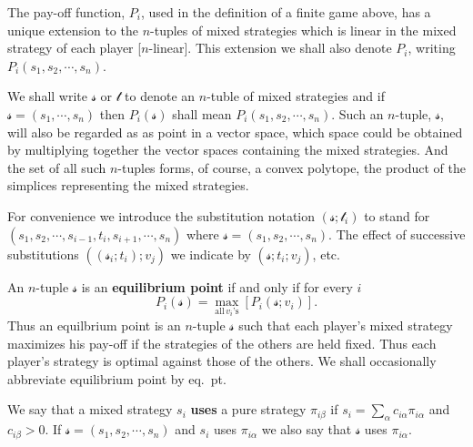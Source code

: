    \begin{definition}
       The pay-off function, $P_i $, used in the definition of a finite game above, has a unique extension to the $n$-tuples of mixed strategies which is linear in the mixed strategy of each player [$n$-linear]. This extension we shall also denote $P_i $, writing $P_i (s_1,s_2,\cdots ,s_n )$.
   \end{definition}
   We shall write $\mathcal{s} $ or $\mathcal{t} $ to denote an $n$-tuble of mixed strategies and if $\mathcal{s} =(s_1,\cdots ,s_n )$ then $P_i (\mathcal{s} )$ shall mean $P_i (s_1,s_2,\cdots ,s_n )$. Such an $n$-tuple, $\mathcal{s} $, will also be regarded as as point in a vector space, which space could be obtained by multiplying together the vector spaces containing the mixed strategies. And the set of all such $n$-tuples forms, of course, a convex polytope, the product of the simplices representing the mixed strategies.

   For convenience we introduce the substitution notation $(\mathcal{s} ;\mathcal{t} _i )$ to stand for $(s_1,s_2,\cdots ,s_{i-1}, t_i ,s_{i+1},\cdots ,s_n )$ where $\mathcal{s} =(s_1,s_2,\cdots ,s_n )$. The effect of successive substitutions $((\mathcal{s} _i ;t_i );v_j )$ we indicate by $(\mathcal{s} ;t_i ;v_j )$, etc.
   \begin{definition}
      An $n$-tuple $\mathcal{s} $ is an \textbf{equilibrium point} if and only if for every $i$ 
      \begin{equation}\label{eqpt}
          P_i (\mathcal{s} )= \underset{\text{all} \, v_i \text{'s} }{\operatorname{max}}\left[ P_i (\mathcal{s} ;v_i ) \right] .
      \end{equation}
\thispagestyle{empty}
      Thus an equilbrium point is an $n$-tuple $\mathcal{s} $ such that each player's mixed strategy maximizes his pay-off if the strategies of the others are held fixed. Thus each player's strategy is optimal against those of the others. We shall occasionally abbreviate equilibrium point by eq.\ pt.
   \end{definition}
   We say that a mixed strategy $s_i $ \textbf{uses} a pure strategy $\pi_{i\beta }$ if $s_i=\sum_{\alpha }^{} c_{i\alpha }\pi_{i\alpha }$ and $c_{i\beta }>0$. If $\mathcal{s} =(s_1,s_2,\cdots ,s_n )$ and $s_i $ uses $\pi_{i\alpha }$ we also say that $\mathcal{s} $ uses $\pi_{i\alpha }$.

